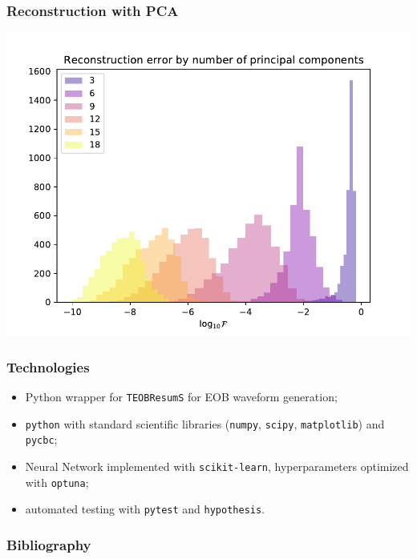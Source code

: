 \documentclass{beamer}
\begin{document}
\begin{frame}
    \frametitle{Reconstruction with PCA}
    
    \centering
    \includegraphics[width=.9\textwidth]{figures/reconstruction_errors_PCA.pdf}
\end{frame}

\begin{frame}
    \frametitle{Technologies}
    
    \begin{itemize}
	\item Python wrapper for \texttt{TEOBResumS} for EOB waveform generation;
	\item \texttt{python} with standard scientific libraries (\texttt{numpy}, \texttt{scipy}, \texttt{matplotlib}) and \texttt{pycbc};
	\item Neural Network implemented with \texttt{scikit-learn}, hyperparameters optimized with \texttt{optuna};
	\item automated testing with \texttt{pytest} and \texttt{hypothesis}.
    \end{itemize}
\end{frame}

\begin{frame}
    \frametitle{Bibliography}
    
    \printbibliography
\end{frame}
\end{document}

